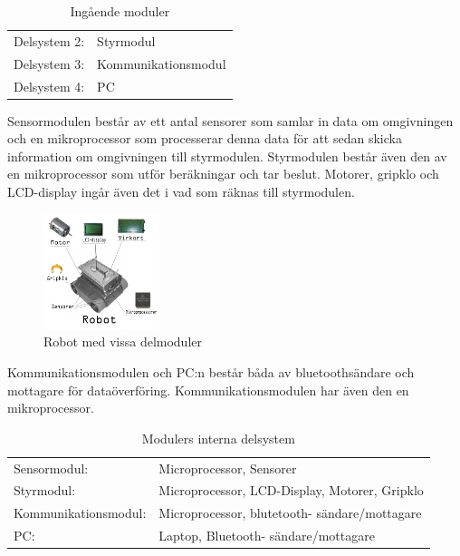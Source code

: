 \documentclass[11pt]{article}
\begin{document}
\begin{flushleft}
\begin{table}[ht]
\begin{tabular}{c l}
Delsystem 2:&
Styrmodul \\

Delsystem 3:&
Kommunikationsmodul \\

Delsystem 4:&
PC \\
\end{tabular}
\caption{Ingående moduler}
\label{tab:Moduler}
\end{table}


\bigskip

Sensormodulen består av ett antal sensorer som samlar in data om omgivningen och en mikroprocessor som processerar denna data för att sedan skicka information om omgivningen till styrmodulen. Styrmodulen består även den av en mikroprocessor som utför beräkningar och tar beslut. Motorer, gripklo och LCD-display ingår även det i vad som räknas till styrmodulen.

\begin{figure}[H]
\centering
\includegraphics[width=0.3\textwidth]{Robot_moduler}
\caption{Robot med vissa delmoduler}
\label{figure:robot}
\end{figure}

Kommunikationsmodulen och PC:n består båda av bluetoothsändare och mottagare för dataöverföring. Kommunikationsmodulen har även den en mikroprocessor.

\bigskip

\begin{table}[ht]

\centering
\begin{tabular}{l l}
Sensormodul:&
Microprocessor, Sensorer \\

Styrmodul:&
Microprocessor, LCD-Display, Motorer, Gripklo\\

Kommunikationsmodul:&
Microprocessor, blutetooth- sändare/mottagare  \\

PC:&
Laptop, Bluetooth- sändare/mottagare \\
\end{tabular}
\caption{Modulers interna delsystem}
\label{tab:Delmoduler}
\end{table}


\end{flushleft}
\end{document}
